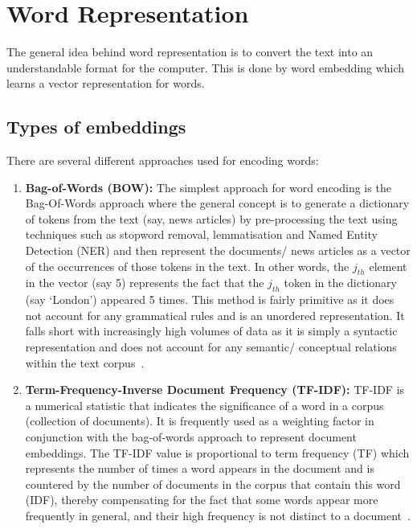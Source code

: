 \section{Word Representation}

The general idea behind word representation is to convert the text into an understandable format for the computer. This is done by word embedding which learns a vector representation for words.

\subsection{Types of embeddings} \label{types_embeddings}

There are several different approaches used for encoding words: 

\begin{enumerate}
    \item \textbf{Bag-of-Words (BOW):} The simplest approach for word encoding is the Bag-Of-Words approach where the general concept is to generate a dictionary of tokens from the text (say, news articles) by pre-processing the text using techniques such as stopword removal, lemmatisation and Named Entity Detection (NER) and then represent the documents/ news articles as a vector of the occurrences of those tokens in the text. In other words, the $j_{th}$ element in the vector (say 5) represents the fact that the $j_{th}$ token in the dictionary (say `London') appeared 5 times. This method is fairly primitive as it does not account for any grammatical rules and is an unordered representation. It falls short with increasingly high volumes of data as it is simply a syntactic representation and does not account for any semantic/ conceptual relations within the text corpus~\cite{elmo_word_rep}.
    

    \item \textbf{Term-Frequency-Inverse Document Frequency (TF-IDF):}  TF-IDF is a numerical statistic that indicates the significance of a word in a corpus (collection of documents). It is frequently used as a weighting factor in conjunction with the bag-of-words approach to represent document embeddings. The TF-IDF value is proportional to term frequency (TF) which represents the number of times a word appears in the document and is countered by the number of documents in the corpus that contain this word (IDF), thereby compensating for the fact that some words appear more frequently in general, and their high frequency is not distinct to a document~\cite{tfidf_mining}.
    

\end{enumerate}

